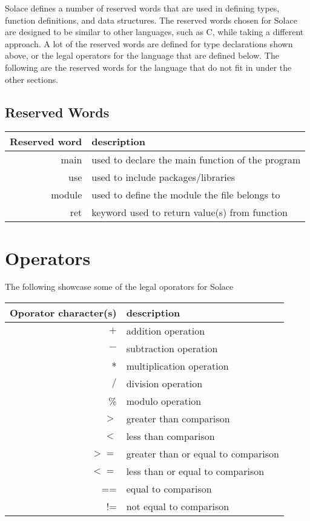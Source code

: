 \documentclass{article}
\begin{document}
Solace defines a number of reserved words that are used in defining types, function definitions,
and data structures. The reserved words chosen for Solace are designed to be similar to
other languages, such as C, while taking a different approach. A lot of the
reserved words are defined for type declarations shown above, or the legal operators for the 
language that are defined below. The following are the reserved words for the language
that do not fit in under the other sections.

\subsection{Reserved Words}

\begin{center}
\begin{tabular}{|r|l|}
\hline
Reserved word & description \\
\hline
\hline
main & used to declare the main function of the program \\
use & used to include packages/libraries \\
module & used to define the module the file belongs to \\
ret & keyword used to return value(s) from function \\
\hline
\end{tabular}
\end{center}


\section{Operators}
The following showcase some of the legal oporators for Solace

\begin{center}
\begin{tabular}{|r|l|}
\hline
Oporator character(s) & description \\
\hline
\hline
$+$ & addition operation \\
$-$ & subtraction operation \\
$*$ & multiplication operation \\
$/$ & division operation \\
\% & modulo operation \\
$>$ & greater than comparison \\
$<$ & less than comparison \\
$>=$ & greater than or equal to comparison \\
$<=$ & less than or equal to comparison \\
== & equal to comparison \\
!= & not equal to comparison \\
\hline
\end{tabular}
\end{center}
\end{document}

